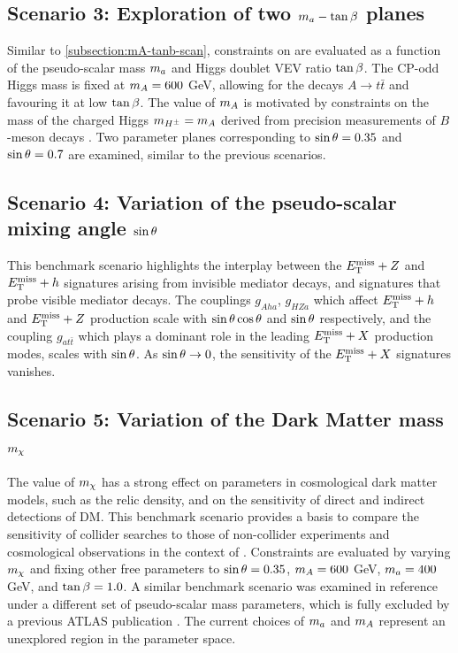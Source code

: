 \subsection{Scenario 3: Exploration of two \texorpdfstring{$m_a-\tan\beta$}{TEXT} planes }\label{subsection:ma-tanb-scan}

Similar to \ref{subsection:mA-tanb-scan}, constraints on \thdma are evaluated as a function of the pseudo-scalar 
mass $m_a$ and Higgs doublet VEV ratio $\tan\beta$. 
The CP-odd Higgs mass is fixed at $m_A=600$ GeV, allowing for the decays $A\rightarrow t\bar{t}$ and favouring it at low $\tan\beta$. 
The value of $m_A$ is motivated by constraints on the mass of the charged Higgs $m_{H^{\pm}} = m_A$ derived from 
precision measurements of $B$-meson decays \cite{Misiak:2017bgg,Bauer:2017ota}. 
Two parameter planes corresponding to $\sin\theta=0.35$ and $\sin\theta=0.7$ are examined, similar to the previous scenarios.

\subsection{Scenario 4: Variation of the pseudo-scalar mixing angle \texorpdfstring{$\sin\theta$}{TEXT} }
\label{subsection:sint-scan}
This benchmark scenario highlights the interplay between the $E_{\mathrm{T}}^{\mathrm{miss}}+Z$ and $E_{\mathrm{T}}^{\mathrm{miss}}+h$ signatures arising from invisible mediator decays, 
and signatures that probe visible mediator decays. 
The couplings $g_{Aha}$, $g_{HZa}$ which affect $E_{\mathrm{T}}^{\mathrm{miss}}+h$ and $E_{\mathrm{T}}^{\mathrm{miss}}+Z$ production scale with $\sin\theta\cos\theta$ and $\sin\theta$ respectively, 
and the coupling $g_{at\bar{t}}$ which plays a dominant role in the leading $E_{\mathrm{T}}^{\mathrm{miss}}+X$ production modes, 
scales with $\sin\theta$. As $\sin\theta\rightarrow 0$, the sensitivity of the $E_{\mathrm{T}}^{\mathrm{miss}}+X$ signatures vanishes. 

\subsection{Scenario 5: Variation of the Dark Matter mass \texorpdfstring{$m_{\chi}$}{TEXT} }
\label{subsection:mchi-scan}
The value of $m_{\chi}$ has a strong effect on parameters in cosmological dark matter models, 
such as the relic density, and on the sensitivity of direct and indirect detections of DM. 
This benchmark scenario provides a basis to compare the sensitivity of collider searches to those of non-collider experiments and cosmological observations in the context of \hdma. 
Constraints are evaluated by varying $m_{\chi}$ and fixing other free parameters to $\sin\theta=0.35$, $m_A=600$ GeV, $m_a=400$ GeV, and $\tan\beta=1.0$. 
A similar benchmark scenario was examined in reference \cite{2HDMWGproxi} under a different set of pseudo-scalar mass parameters, 
which is fully excluded by a previous ATLAS publication \cite{EXOT-2017-32}. 
The current choices of $m_a$ and $m_A$ represent an unexplored region in the parameter space. 

